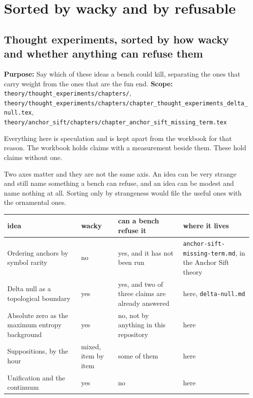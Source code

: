 \chapter{Sorted by wacky and by refusable}

\section{Thought experiments, sorted by how wacky and whether anything can refuse them}

\textbf{Purpose:} Say which of these ideas a bench could kill, separating the ones that carry weight from the ones that are the fun end. \textbf{Scope:} \texttt{theory/\allowbreak{}thought\_\allowbreak{}experiments/\allowbreak{}chapters/\allowbreak{}}, \texttt{theory/\allowbreak{}thought\_\allowbreak{}experiments/\allowbreak{}chapters/\allowbreak{}chapter\_\allowbreak{}thought\_\allowbreak{}experiments\_\allowbreak{}delta\_\allowbreak{}null.\allowbreak{}tex}, \texttt{theory/\allowbreak{}anchor\_\allowbreak{}sift/\allowbreak{}chapters/\allowbreak{}chapter\_\allowbreak{}anchor\_\allowbreak{}sift\_\allowbreak{}missing\_\allowbreak{}term.\allowbreak{}tex}

Everything here is speculation and is kept apart from the workbook for that reason. The workbook holds claims with a measurement beside them. These hold claims without one.

Two axes matter and they are not the same axis. An idea can be very strange and still name something a bench can refuse, and an idea can be modest and name nothing at all. Sorting only by strangeness would file the useful ones with the ornamental ones.

\tiny
\setlength{\tabcolsep}{2pt}
\begin{longtable}{@{}>{\setlength{\rightskip}{0pt}\setlength{\parfillskip}{0pt}\arraybackslash}p{}>{\setlength{\rightskip}{0pt}\setlength{\parfillskip}{0pt}\arraybackslash}p{}>{\setlength{\rightskip}{0pt}\setlength{\parfillskip}{0pt}\arraybackslash}p{}>{\setlength{\rightskip}{0pt}\setlength{\parfillskip}{0pt}\arraybackslash}p{}@{}}
\toprule
idea & wacky & can a bench refuse it & where it lives \\
\midrule
Ordering anchors by symbol rarity & no & yes, and it has not been run & \texttt{anchor-\allowbreak{}sift-\allowbreak{}missing-\allowbreak{}term.\allowbreak{}md}, in the Anchor Sift theory \\
Delta null as a topological boundary & yes & yes, and two of three claims are already answered & here, \texttt{delta-\allowbreak{}null.\allowbreak{}md} \\
Absolute zero as the maximum entropy background & yes & no, not by anything in this repository & here \\
Suppositions, by the hour & mixed, item by item & some of them & here \\
Unification and the continuum & yes & no & here \\
\bottomrule
\end{longtable}
\normalsize


